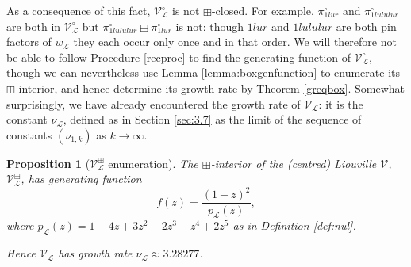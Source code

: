 \documentclass[11pt,a4paper]{article}
\newtheorem{prop}[thm]{Proposition}
\theoremstyle{definition}
\begin{document}
As a consequence of this fact, $\mathcal{V}^{\circ}_{\mathcal{L}}$ is not $\boxplus$-closed. For example, $\pi^{\circ}_{1lur}$ and $\pi^{\circ}_{1lululur}$ are both in $\mathcal{V}^{\circ}_{\mathcal{L}}$ but $\pi^{\circ}_{1lululur} \boxplus \pi^{\circ}_{1lur}$ is not: though $1lur$ and $1lululur$ are both pin factors of $w_{\mathcal{L}}$ they each occur only once and in that order. We will therefore not be able to follow Procedure \ref{recproc} to find the generating function of $\mathcal{V}^{\circ}_{\mathcal{L}}$, though we can nevertheless use Lemma \ref{lemma:boxgenfunction} to enumerate its $\boxplus$-interior, and hence determine its growth rate by Theorem \ref{greqbox}. Somewhat surprisingly, we have already encountered the growth rate of $\mathcal{V}_{\mathcal{L}}$: it is the constant $\nu_{\mathcal{L}}$, defined as in Section \ref{sec:3.7} as the limit of the sequence of constants $(\nu_{1,k})$ as $k \rightarrow \infty$.

\begin{prop}[$\mathcal{V}^{\boxplus}_{\mathcal{L}}$ enumeration] \label{prop:VLcentenum}
The $\boxplus$-interior of the (centred) Liouville $\mathcal{V}$, $\mathcal{V}^{\boxplus}_{\mathcal{L}}$, has generating function
\begin{equation} \label{kkio0}
f(z) = \frac{(1-z)^2}{p_{\mathcal{L}}(z)},
\end{equation}
where $p_{\mathcal{L}}(z) = 1 - 4z + 3z^2 - 2z^3 - z^4 + 2z^5$ as in Definition \ref{def:nul}.

Hence $\mathcal{V}_{\mathcal{L}}$ has growth rate $\nu_{\mathcal{L}} \approx 3.28277$.
\end{prop}
\end{document}
